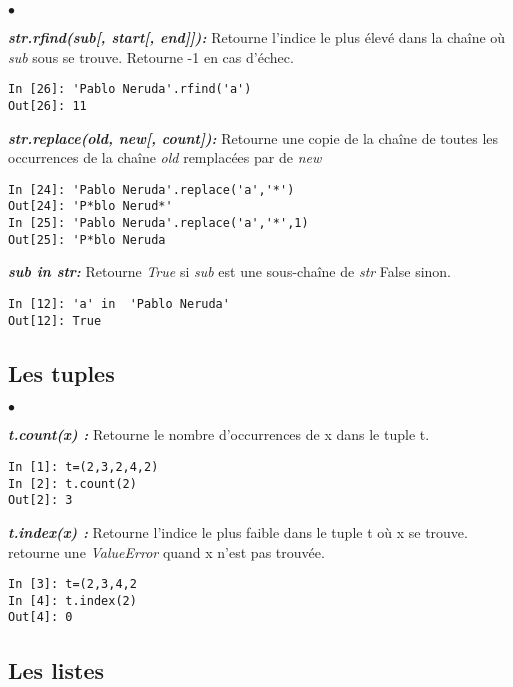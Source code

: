 \documentclass[10pt,dvipsnames,  dvips]{article}
\begin{document}
\begin{list}{$\bullet$}{}
\item \textit{\textbf{str.rfind(sub[, start[, end]]): }} Retourne l'indice le plus élevé dans la chaîne où \textit{sub} sous se trouve. Retourne -1 en cas d'échec.
\begin{lstlisting}
In [26]: 'Pablo Neruda'.rfind('a')
Out[26]: 11
\end{lstlisting}
\item \textit{\textbf{str.replace(old, new[, count]): }} Retourne une copie de la chaîne de toutes les occurrences de la chaîne \textit{old} remplacées par de \textit{new}
\begin{lstlisting}
In [24]: 'Pablo Neruda'.replace('a','*')
Out[24]: 'P*blo Nerud*'
In [25]: 'Pablo Neruda'.replace('a','*',1)
Out[25]: 'P*blo Neruda
\end{lstlisting}
\item  \textit{\textbf{sub in str: }} Retourne \textit{True}  si \textit{sub} est une sous-chaîne de \textit{str} False sinon.
\begin{lstlisting}
In [12]: 'a' in  'Pablo Neruda'
Out[12]: True
\end{lstlisting}
\end{list}




\subsection{Les tuples}

\begin{list}{$\bullet$}{}
\item \textit{\textbf{t.count(x) :}} Retourne le nombre d'occurrences de x dans le tuple t.
\begin{lstlisting}
In [1]: t=(2,3,2,4,2)
In [2]: t.count(2)
Out[2]: 3
\end{lstlisting}
\item \textit{\textbf{t.index(x) :}}  Retourne l'indice le plus faible dans le tuple t où x se trouve. retourne une \textit{ValueError} quand x n'est pas trouvée.
\begin{lstlisting}
In [3]: t=(2,3,4,2
In [4]: t.index(2)
Out[4]: 0
\end{lstlisting}
\end{list}

\subsection{Les listes}
\end{document}
